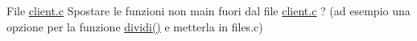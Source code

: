 
\begin{DoxyRefList}
\item[File \mbox{\hyperlink{client_8c}{client.c}} ]\label{todo__todo000001}%
%
Spostare le funzioni non main fuori dal file \mbox{\hyperlink{client_8c}{client.\+c}} ? (ad esempio una opzione per la funzione \mbox{\hyperlink{client_8c_a55586f2b7e9b3620294cf78cda8abdad}{dividi()}} e\textquotesingle{} metterla in files.\+c) 
\end{DoxyRefList}